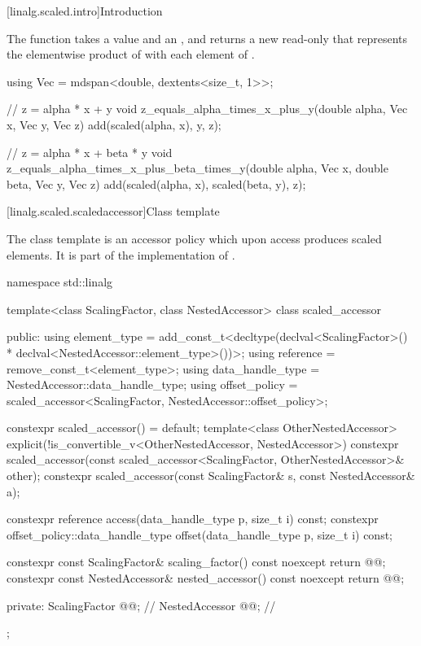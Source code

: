 [linalg.scaled.intro]{Introduction}

\pnum
The  function
takes a value  and an  , and
returns a new read-only 
that represents
the elementwise product of  with each element of .
\begin{example}
\begin{codeblock}
using Vec = mdspan<double, dextents<size_t, 1>>;

// z = alpha * x + y
void z_equals_alpha_times_x_plus_y(double alpha, Vec x, Vec y, Vec z) {
  add(scaled(alpha, x), y, z);
}

// z = alpha * x + beta * y
void z_equals_alpha_times_x_plus_beta_times_y(double alpha, Vec x, double beta, Vec y, Vec z) {
  add(scaled(alpha, x), scaled(beta, y), z);
}
\end{codeblock}
\end{example}

[linalg.scaled.scaledaccessor]{Class template }


\pnum
The class template  is an  accessor policy
which upon access produces scaled elements.
It is part of the implementation of .
\begin{codeblock}
namespace std::linalg {
  template<class ScalingFactor, class NestedAccessor>
  class scaled_accessor {
  public:
    using element_type =
      add_const_t<decltype(declval<ScalingFactor>() * declval<NestedAccessor::element_type>())>;
    using reference = remove_const_t<element_type>;
    using data_handle_type = NestedAccessor::data_handle_type;
    using offset_policy = scaled_accessor<ScalingFactor, NestedAccessor::offset_policy>;

    constexpr scaled_accessor() = default;
    template<class OtherNestedAccessor>
      explicit(!is_convertible_v<OtherNestedAccessor, NestedAccessor>)
        constexpr scaled_accessor(const scaled_accessor<ScalingFactor,
                                                        OtherNestedAccessor>& other);
    constexpr scaled_accessor(const ScalingFactor& s, const NestedAccessor& a);

    constexpr reference access(data_handle_type p, size_t i) const;
    constexpr offset_policy::data_handle_type offset(data_handle_type p, size_t i) const;

    constexpr const ScalingFactor& scaling_factor() const noexcept { return @@; }
    constexpr const NestedAccessor& nested_accessor() const noexcept { return @@; }

  private:
    ScalingFactor @@{};                              // \expos
    NestedAccessor @@{};                            // \expos
  };
}
\end{codeblock}

